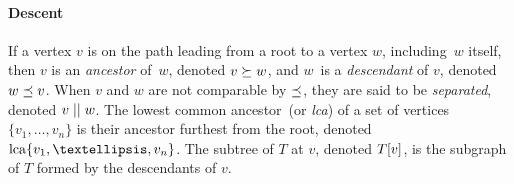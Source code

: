\paragraph{Descent}
If a vertex \(v\) is on the path leading from a root to a vertex \(w\), including~\(w\) itself, then \(v\) is an \emph{ancestor} of~\(w\), denoted \(v \succeq w\), and \(w\)~is a \emph{descendant} of \(v\), denoted \(w \preceq v\).
When \(v\) and \(w\) are not comparable by \(\preceq\), they are said to be \emph{separated}, denoted \(v \mathrel{||} w\).
The lowest common ancestor~(or \emph{lca}) of a set of vertices \(\{v_1, …, v_n\}\) is their ancestor furthest from the root, denoted \(\lca\{v_1, …, v_n\}\).
The subtree of \(T\) at \(v\), denoted \(T[v]\), is the subgraph of \(T\) formed by the descendants of \(v\).


\onecolumn
